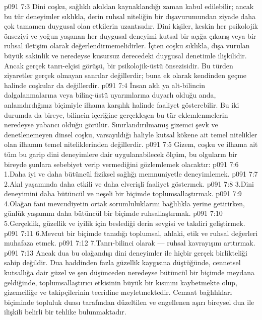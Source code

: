 \vs p091 7:3 Dini coşku, sağlıklı akıldan kaynaklandığı zaman kabul edilebilir; ancak bu tür deneyimler sıklıkla, derin ruhsal niteliğin bir dışavurumundan ziyade daha çok tamamen duygusal olan etkilerin uzantısıdır. Dini kişiler, keskin her psikolojik önseziyi ve yoğun yaşanan her duygusal deneyimi kutsal bir açığa çıkarış veya bir ruhsal iletişim olarak değerlendirmemelidirler. İçten coşku sıklıkla, dışa vurulan büyük sakinlik ve neredeyse kusursuz derecedeki duygusal denetimle ilişkilidir. Ancak gerçek tanrı\hyp{}elçisi görüşü, bir psikolojik\hyp{}üstü önsezisidir. Bu türden ziyaretler gerçek olmayan sanrılar değillerdir; buna ek olarak kendinden geçme halinde coşkular da değillerdir.
\vs p091 7:4 İnsan aklı ya alt\hyp{}bilincin dalgalanmalarına veya bilinç\hyp{}üstü uyarımlarına duyarlı olduğu anda, anlamdırdığınız biçimiyle ilhama karşılık halinde faaliyet gösterebilir. Bu iki durumda da bireye, bilincin içeriğine gerçekleşen bu tür eklemlenmelerin neredeyse yabancı olduğu görülür. Sınırlandırılmamış gizemci şevk ve denetlenemeyen dinsel coşku, varsayıldığı haliyle kutsal kökene ait temel nitelikler olan ilhamın temel niteliklerinden değillerdir.
\vs p091 7:5 Gizem, coşku ve ilhama ait tüm bu garip dini deneyimlere dair uygulanabilecek ölçüm, bu olguların bir bireyde şunlara sebebiyet verip vermediğini gözlemlemek olacaktır:
\vs p091 7:6 1.\bibnobreakspace Daha iyi ve daha bütüncül fiziksel sağlığı memnuniyetle deneyimlemek.
\vs p091 7:7 2.\bibnobreakspace Akıl yaşamında daha etkili ve daha elverişli faaliyet göstermek.
\vs p091 7:8 3.\bibnobreakspace Dini deneyimini daha bütüncül ve neşeli bir biçimde toplumsallaştırmak.
\vs p091 7:9 4.\bibnobreakspace Olağan fani mevcudiyetin ortak sorumluluklarını bağlılıkla yerine getirirken, günlük yaşamını daha bütüncül bir biçimde ruhsallaştırmak.
\vs p091 7:10 5.\bibnobreakspace Gerçeklik, güzellik ve iyilik için beslediği derin sevgisi ve takdiri geliştirmek.
\vs p091 7:11 6.\bibnobreakspace Mevcut bir biçimde tanıdığı toplumsal, ahlaki, etik ve ruhsal değerleri muhafaza etmek.
\vs p091 7:12 7.\bibnobreakspace Tanrı\hyp{}bilinci olarak --- ruhsal kavrayışını arttırmak.
\vs p091 7:13 Ancak dua bu olağandışı dini deneyimler ile hiçbir gerçek birlikteliği sahip değildir. Dua haddinden fazla güzellik kaygısına düştüğünde, cennetsel kutsallığa dair güzel ve şen düşünceden neredeyse bütüncül bir biçimde meydana geldiğinde, toplumsallaştırıcı etkisinin büyük bir kısmını kaybetmekte olup, gizemciliğe ve takipçilerinin tecridine meyletmektedir. Cemaat bağlılıkları biçiminde topluluk duası tarafından düzeltilen ve engellenen aşırı bireysel dua ile ilişkili belirli bir tehlike bulunmaktadır.

